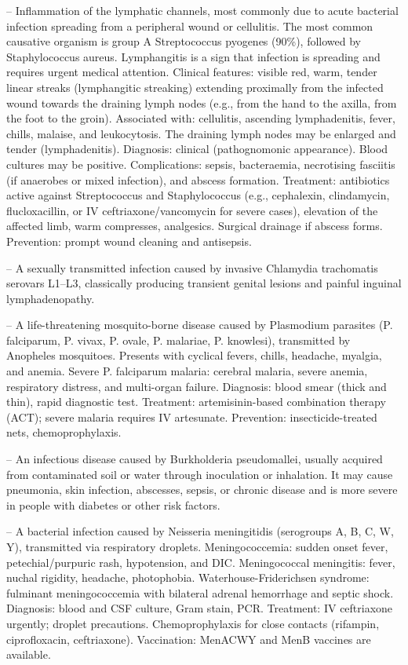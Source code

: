 -- Inflammation of the lymphatic channels, most commonly due to acute bacterial infection spreading from a peripheral wound or cellulitis. The most common causative organism is group A Streptococcus pyogenes (90\%), followed by Staphylococcus aureus. Lymphangitis is a sign that infection is spreading and requires urgent medical attention. Clinical features: visible red, warm, tender linear streaks (lymphangitic streaking) extending proximally from the infected wound towards the draining lymph nodes (e.g., from the hand to the axilla, from the foot to the groin). Associated with: cellulitis, ascending lymphadenitis, fever, chills, malaise, and leukocytosis. The draining lymph nodes may be enlarged and tender (lymphadenitis). Diagnosis: clinical (pathognomonic appearance). Blood cultures may be positive. Complications: sepsis, bacteraemia, necrotising fasciitis (if anaerobes or mixed infection), and abscess formation. Treatment: antibiotics active against Streptococcus and Staphylococcus (e.g., cephalexin, clindamycin, flucloxacillin, or IV ceftriaxone/vancomycin for severe cases), elevation of the affected limb, warm compresses, analgesics. Surgical drainage if abscess forms. Prevention: prompt wound cleaning and antisepsis.

-- A sexually transmitted infection caused by invasive Chlamydia trachomatis serovars L1–L3, classically producing transient genital lesions and painful inguinal lymphadenopathy.

-- A life-threatening mosquito-borne disease caused by Plasmodium parasites (P. falciparum, P. vivax, P. ovale, P. malariae, P. knowlesi), transmitted by Anopheles mosquitoes. Presents with cyclical fevers, chills, headache, myalgia, and anemia. Severe P. falciparum malaria: cerebral malaria, severe anemia, respiratory distress, and multi-organ failure. Diagnosis: blood smear (thick and thin), rapid diagnostic test. Treatment: artemisinin-based combination therapy (ACT); severe malaria requires IV artesunate. Prevention: insecticide-treated nets, chemoprophylaxis.

-- An infectious disease caused by Burkholderia pseudomallei, usually acquired from contaminated soil or water through inoculation or inhalation. It may cause pneumonia, skin infection, abscesses, sepsis, or chronic disease and is more severe in people with diabetes or other risk factors.

-- A bacterial infection caused by Neisseria meningitidis (serogroups A, B, C, W, Y), transmitted via respiratory droplets. Meningococcemia: sudden onset fever, petechial/purpuric rash, hypotension, and DIC. Meningococcal meningitis: fever, nuchal rigidity, headache, photophobia. Waterhouse-Friderichsen syndrome: fulminant meningococcemia with bilateral adrenal hemorrhage and septic shock. Diagnosis: blood and CSF culture, Gram stain, PCR. Treatment: IV ceftriaxone urgently; droplet precautions. Chemoprophylaxis for close contacts (rifampin, ciprofloxacin, ceftriaxone). Vaccination: MenACWY and MenB vaccines are available.

